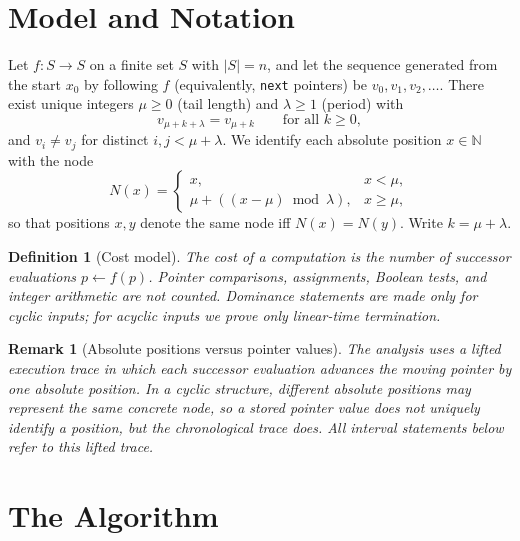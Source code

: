 \documentclass[11pt]{article}
\newtheorem{definition}[theorem]{Definition}
\newtheorem{remark}[theorem]{Remark}
\newcommand{\nextop}{\texttt{next}}
\begin{document}
\section{Model and Notation}
\label{sec:model}

Let $f:S\to S$ on a finite set $S$ with $|S|=n$, and let the sequence generated
from the start $x_0$ by following $f$ (equivalently, \nextop{} pointers) be
$v_0,v_1,v_2,\dots$. There exist unique integers $\mu\ge 0$ (tail length) and
$\lambda\ge 1$ (period) with
\[
v_{\mu+k+\lambda}=v_{\mu+k}\qquad\text{for all }k\ge 0,
\]
and $v_i\ne v_j$ for distinct $i,j<\mu+\lambda$. We identify each absolute
position $x\in\mathbb N$ with the node
\[
N(x)=\begin{cases}x,&x<\mu,\\ \mu+((x-\mu)\bmod \lambda),&x\ge \mu,\end{cases}
\]
so that positions $x,y$ denote the same node iff $N(x)=N(y)$. Write
$k=\mu+\lambda$.

\begin{definition}[Cost model]
\label{def:cost}
The cost of a computation is the number of successor evaluations
$p\leftarrow f(p)$. Pointer comparisons, assignments, Boolean tests, and integer
arithmetic are not counted. Dominance statements are made only for cyclic inputs;
for acyclic inputs we prove only linear-time termination.
\end{definition}

\begin{remark}[Absolute positions versus pointer values]
The analysis uses a lifted execution trace in which each successor evaluation
advances the moving pointer by one absolute position. In a cyclic structure,
different absolute positions may represent the same concrete node, so a stored
pointer value does not uniquely identify a position, but the chronological trace
does. All interval statements below refer to this lifted trace.
\end{remark}

\section{The Algorithm}
\label{sec:algo}
\end{document}
